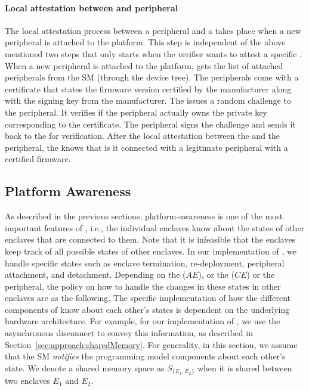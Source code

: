 \paragraph{Local attestation between \ce and peripheral} The local attestation process between a peripheral and a \ce takes place when a new peripheral is attached to the platform. This step is independent of the above mentioned two steps that only starts when the verifier wants to attest a specific \app. When a new peripheral is attached to the platform, \ce gets the list of attached peripherals from the SM (through the device tree). The peripherals come with a certificate that states the firmware version certified by the manufacturer along with the signing key from the manufacturer. The \ce issues a random challenge to the peripheral. It verifies if the peripheral actually owns the private key corresponding to the certificate. The peripheral signs the challenge and sends it back to the \ce for verification.
After the local attestation between the \ce and the peripheral, the \ce knows that is it connected with a legitimate peripheral with a certified firmware.
 


\subsection{Platform Awareness}
\label{sec:programmingModel:platformAwareness}

As described in the previous sections, platform-awareness is one of the most important features of \Nameenclave, i.e., the individual enclaves know about the states of other enclaves that are connected to them. Note that it is infeasible that the enclaves keep track of all possible states of other enclaves. In our implementation of \name, we handle specific states such as enclave termination, re-deployment, peripheral attachment, and detachment. Depending on the \app ($AE$), or the \ce ($CE$) or the peripheral, the policy on how to handle the changes in these states in other enclaves are as the following. The specific implementation of how the different components of \Nameenclave know about each other's states is dependent on the underlying hardware architecture. For example, for our implementation of \name, we use the asynchronous disconnect to convey this information, as described in Section~\ref{sec:approach:sharedMemory}. For generality, in this section, we assume that the SM \emph{notifies} the programming model components about each other's state. We denote a shared memory space as $S_{\{E_1, E_2\}}$ when it is shared between two enclaves $E_1$ and $E_2$.


